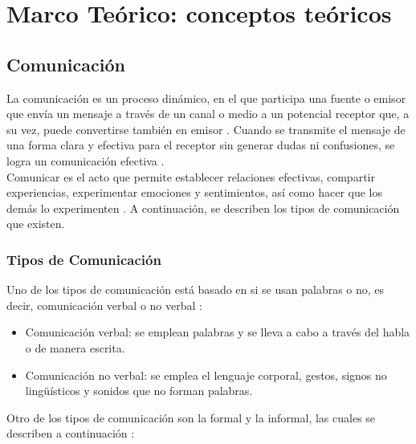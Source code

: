 \chapter{Marco Teórico: conceptos teóricos}
\section{Comunicación}
La comunicación es un proceso dinámico, en el que participa una fuente o emisor que envía un mensaje a través de un canal o medio a un potencial receptor que, a su vez, puede convertirse también en emisor \cite{ref20}. Cuando se transmite el mensaje de una forma clara y efectiva para el receptor sin generar dudas ni confusiones, se logra un comunicación efectiva \cite{ref21}.\\

Comunicar es el acto que permite establecer relaciones efectivas, compartir experiencias, experimentar emociones y sentimientos, así como hacer que los demás lo experimenten \cite{ref22}. A continuación, se describen los tipos de comunicación que existen.

\subsection{Tipos de Comunicación}
Uno de los tipos de comunicación está basado en si se usan palabras o no, es decir, comunicación verbal o no verbal \cite{ref23}:
\begin{itemize}
    \item Comunicación verbal: se emplean palabras y se lleva a cabo a través del habla o de manera escrita.
\item Comunicación no verbal: se emplea el lenguaje corporal, gestos, signos no lingüísticos y sonidos que no forman palabras.
\end{itemize}
Otro de los tipos de comunicación son la formal y la informal, las cuales se describen a continuación \cite{ref23}:

